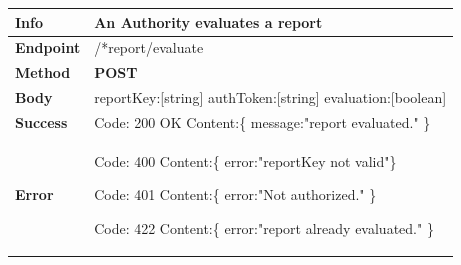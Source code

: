 \begin{table}[H]
\begin{tabular}{|l|p{}|}
\hline
\textbf{Info}             & An Authority evaluates a report                                                           \\ \hline
\textbf{Endpoint}    &  /*report/evaluate \\ \hline
\textbf{Method}         &   \textbf{POST}                                                                            \\ \hline

\textbf{Body}  &    reportKey:[string]\newline
                    authToken:[string]\newline
                    evaluation:[boolean]
                    \\ \hline
                    
\textbf{Success} &  Code: 200 OK \newline
                    Content:\{\newline 
                  message:"report evaluated."\newline
                    \}\\ \hline
\textbf{Error} &  Code: 400 \newline
                  Content:\{\newline
                  error:"reportKey not valid"\newline\}\newline
                  
                  Code: 401 \newline
                  Content:\{\newline
                  error:"Not authorized." \newline\}\newline
                  
                   Code: 422 \newline
                  Content:\{\newline
                  error:"report already evaluated." \newline
                  \}\newline
                  
                \\\hline

\end{tabular}
\end{table}





